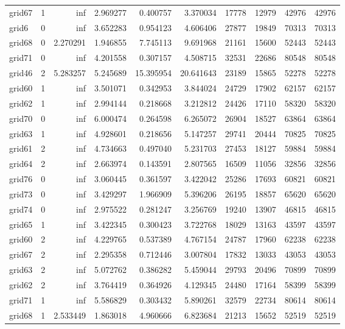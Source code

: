 \begin{longtable}{|l|r|r|r|r|r|r|r|r|r|}
grid67 & 1 & inf & 2.969277 & 0.400757 & 3.370034 & 17778 & 12979 & 42976 & 42976 \\
grid6 & 0 & inf & 3.652283 & 0.954123 & 4.606406 & 27877 & 19849 & 70313 & 70313 \\
grid68 & 0 & 2.270291 & 1.946855 & 7.745113 & 9.691968 & 21161 & 15600 & 52443 & 52443 \\
grid71 & 0 & inf & 4.201558 & 0.307157 & 4.508715 & 32531 & 22686 & 80548 & 80548 \\
grid46 & 2 & 5.283257 & 5.245689 & 15.395954 & 20.641643 & 23189 & 15865 & 52278 & 52278 \\
grid60 & 1 & inf & 3.501071 & 0.342953 & 3.844024 & 24729 & 17902 & 62157 & 62157 \\
grid62 & 1 & inf & 2.994144 & 0.218668 & 3.212812 & 24426 & 17110 & 58320 & 58320 \\
grid70 & 0 & inf & 6.000474 & 0.264598 & 6.265072 & 26904 & 18527 & 63864 & 63864 \\
grid63 & 1 & inf & 4.928601 & 0.218656 & 5.147257 & 29741 & 20444 & 70825 & 70825 \\
grid61 & 2 & inf & 4.734663 & 0.497040 & 5.231703 & 27453 & 18127 & 59884 & 59884 \\
grid64 & 2 & inf & 2.663974 & 0.143591 & 2.807565 & 16509 & 11056 & 32856 & 32856 \\
grid76 & 0 & inf & 3.060445 & 0.361597 & 3.422042 & 25286 & 17693 & 60821 & 60821 \\
grid73 & 0 & inf & 3.429297 & 1.966909 & 5.396206 & 26195 & 18857 & 65620 & 65620 \\
grid74 & 0 & inf & 2.975522 & 0.281247 & 3.256769 & 19240 & 13907 & 46815 & 46815 \\
grid65 & 1 & inf & 3.422345 & 0.300423 & 3.722768 & 18029 & 13163 & 43597 & 43597 \\
grid60 & 2 & inf & 4.229765 & 0.537389 & 4.767154 & 24787 & 17960 & 62238 & 62238 \\
grid67 & 2 & inf & 2.295358 & 0.712446 & 3.007804 & 17832 & 13033 & 43053 & 43053 \\
grid63 & 2 & inf & 5.072762 & 0.386282 & 5.459044 & 29793 & 20496 & 70899 & 70899 \\
grid62 & 2 & inf & 3.764419 & 0.364926 & 4.129345 & 24480 & 17164 & 58399 & 58399 \\
grid71 & 1 & inf & 5.586829 & 0.303432 & 5.890261 & 32579 & 22734 & 80614 & 80614 \\
grid68 & 1 & 2.533449 & 1.863018 & 4.960666 & 6.823684 & 21213 & 15652 & 52519 & 52519 \\

\end{longtable}
